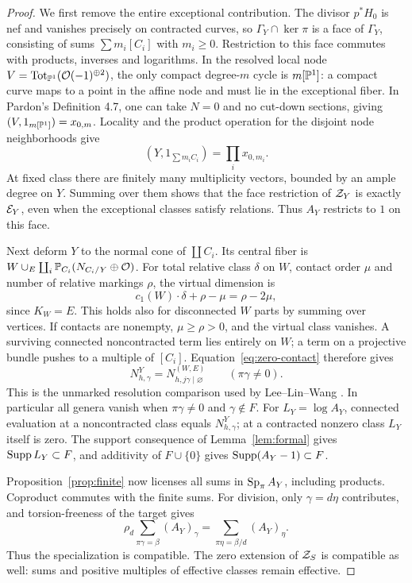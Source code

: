 \begin{proof}
We first remove the entire exceptional contribution. The divisor
$p^*H_0$ is nef and vanishes precisely on contracted curves, so
$\Gamma_Y\cap\ker\pi$ is a face of $\Gamma_Y$, consisting of sums
$\sum m_i[C_i]$ with $m_i\ge0$. Restriction to this face commutes
with products, inverses and logarithms. In the resolved local node
$V=\operatorname{Tot}_{\mathbb P^1}(\mathcal O(-1)^{\oplus2})$, the only compact
degree-$m$ cycle is $m[\mathbb P^1]$: a compact curve maps to a point in the
affine node and must lie in the exceptional fiber. In Pardon's
Definition 4.7, one can take $N=0$ and no cut-down sections, giving
$(V,1_{m[\mathbb P^1]})=x_{0,m}$. Locality and the product operation for
the disjoint node neighborhoods give
\[
 (Y,1_{\sum m_i C_i})=\prod_i x_{0,m_i}.
\]
At fixed class there are finitely many multiplicity vectors, bounded
by an ample degree on $Y$. Summing over them shows that the face
restriction of $\mathcal Z_Y$ is exactly $\mathcal E_Y$, even when the exceptional
classes satisfy relations. Thus $A_Y$ restricts to $1$ on this face.

Next deform $Y$ to the normal cone of $\coprod C_i$. Its central
fiber is $W\cup_E\coprod_i\mathbb P_{C_i}(N_{C_i/Y}\oplus\mathcal O)$.
For total relative class $\delta$ on $W$, contact order $\mu$ and
number of relative markings $\rho$, the virtual dimension is
\begin{equation}\label{eq:vdim}
 c_1(W)\cdot\delta+\rho-\mu=\rho-2\mu,
\end{equation}
since $K_W=E$. This holds also for disconnected $W$ parts by summing
over vertices. If contacts are nonempty, $\mu\ge\rho>0$, and the
virtual class vanishes. A surviving connected noncontracted term
lies entirely on $W$; a term on a projective bundle pushes to a
multiple of $[C_i]$. Equation~\eqref{eq:zero-contact} therefore gives
\begin{equation}\label{eq:relative}
 N^Y_{h,\gamma}=N^{(W,E)}_{h,j\gamma\mid\varnothing}
      \qquad(\pi\gamma\ne0).
\end{equation}
This is the unmarked resolution comparison used by Lee--Lin--Wang
\cite[Section 2.1]{LLW}. In particular all genera vanish when
$\pi\gamma\ne0$ and $\gamma\notin F$. For $L_Y=\log A_Y$, connected evaluation at a
noncontracted class equals $N^Y_{h,\gamma}$; at a contracted nonzero
class $L_Y$ itself is zero. The support consequence of
Lemma~\ref{lem:formal} gives $\operatorname{Supp} L_Y\subset F$, and additivity
of $F\cup\{0\}$ gives $\operatorname{Supp}(A_Y-1)\subset F$.

Proposition~\ref{prop:finite} now licenses all sums in $\operatorname{Sp}_\pi A_Y$,
including products. Coproduct commutes with the finite sums. For
division, only $\gamma=d\eta$ contributes, and torsion-freeness of
the target gives
\[
 \rho_d\sum_{\pi\gamma=\beta}(A_Y)_\gamma
 =\sum_{\pi\eta=\beta/d}(A_Y)_\eta.
\]
Thus the specialization is compatible. The zero extension of $\mathcal Z_S$
is compatible as well: sums and positive multiples of effective
classes remain effective.


\end{proof}
